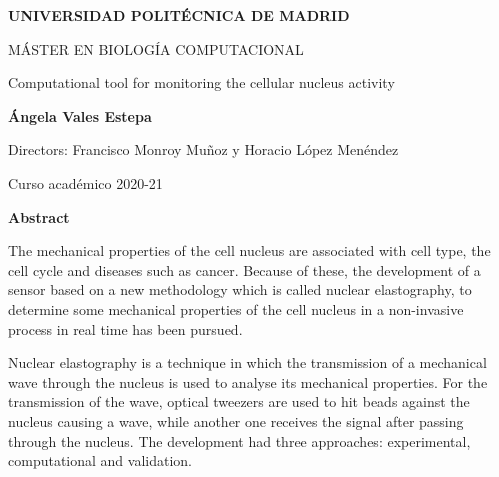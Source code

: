 \documentclass[12pt, a4paper]{article} %
\begin{document}
	
	\setlength{\parindent}{8pt}
	
	\pagestyle{empty}
	
	
	\begin{titlepage}
		
		{} %
		\vspace{1cm}
		
		\centering
		{ \bfseries \Large UNIVERSIDAD POLITÉCNICA DE MADRID}
		\vspace{2cm}
		
		{ \Large MÁSTER EN BIOLOGÍA COMPUTACIONAL}
		\vspace{2cm}
		
		{\Large Computational tool for monitoring the cellular nucleus activity}\vspace{2cm}
		
		{\bfseries \LARGE Ángela Vales Estepa}\vspace{2cm}
		
		{\Large Directors: Francisco Monroy Muñoz y Horacio López Menéndez}\vspace{20mm} 
		
		{\large Curso acad\'emico 2020-21}\vspace{5mm} 
		
	\end{titlepage}
	\newpage
	
	
	{\bfseries \Large Abstract }\vspace{5mm} 
	
	The mechanical properties of the cell nucleus are associated with cell type, the cell cycle and diseases such as cancer. Because of these, the development of a sensor based on a new methodology which is called nuclear elastography, to determine some mechanical properties of the cell nucleus in a non-invasive process in real time has been pursued.
	
	Nuclear elastography is a technique in which the transmission of a mechanical wave through the nucleus is used to analyse its mechanical properties. For the transmission of the wave, optical tweezers are used to hit beads against the nucleus causing a wave, while another one receives the signal after passing through the nucleus. The development had three approaches: experimental, computational and validation. 
	
\end{document}
